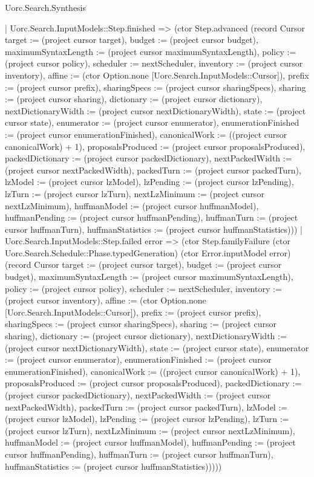 \begin{lexlean}{Uorc.Search.Synthesis}
\begin{semanticmodule}
{          | Uorc.Search.InputModels::Step.finished => (ctor Step.advanced (record Cursor {target := (project cursor target), budget := (project cursor budget), maximumSyntaxLength := (project cursor maximumSyntaxLength), policy := (project cursor policy), scheduler := nextScheduler, inventory := (project cursor inventory), affine := (ctor Option.none [Uorc.Search.InputModels::Cursor]), prefix := (project cursor prefix), sharingSpecs := (project cursor sharingSpecs), sharing := (project cursor sharing), dictionary := (project cursor dictionary), nextDictionaryWidth := (project cursor nextDictionaryWidth), state := (project cursor state), enumerator := (project cursor enumerator), enumerationFinished := (project cursor enumerationFinished), canonicalWork := ((project cursor canonicalWork) + 1), proposalsProduced := (project cursor proposalsProduced), packedDictionary := (project cursor packedDictionary), nextPackedWidth := (project cursor nextPackedWidth), packedTurn := (project cursor packedTurn), lzModel := (project cursor lzModel), lzPending := (project cursor lzPending), lzTurn := (project cursor lzTurn), nextLzMinimum := (project cursor nextLzMinimum), huffmanModel := (project cursor huffmanModel), huffmanPending := (project cursor huffmanPending), huffmanTurn := (project cursor huffmanTurn), huffmanStatistics := (project cursor huffmanStatistics)}))
          | Uorc.Search.InputModels::Step.failed error => (ctor Step.familyFailure (ctor Uorc.Search.Schedule::Phase.typedGeneration) (ctor Error.inputModel error) (record Cursor {target := (project cursor target), budget := (project cursor budget), maximumSyntaxLength := (project cursor maximumSyntaxLength), policy := (project cursor policy), scheduler := nextScheduler, inventory := (project cursor inventory), affine := (ctor Option.none [Uorc.Search.InputModels::Cursor]), prefix := (project cursor prefix), sharingSpecs := (project cursor sharingSpecs), sharing := (project cursor sharing), dictionary := (project cursor dictionary), nextDictionaryWidth := (project cursor nextDictionaryWidth), state := (project cursor state), enumerator := (project cursor enumerator), enumerationFinished := (project cursor enumerationFinished), canonicalWork := ((project cursor canonicalWork) + 1), proposalsProduced := (project cursor proposalsProduced), packedDictionary := (project cursor packedDictionary), nextPackedWidth := (project cursor nextPackedWidth), packedTurn := (project cursor packedTurn), lzModel := (project cursor lzModel), lzPending := (project cursor lzPending), lzTurn := (project cursor lzTurn), nextLzMinimum := (project cursor nextLzMinimum), huffmanModel := (project cursor huffmanModel), huffmanPending := (project cursor huffmanPending), huffmanTurn := (project cursor huffmanTurn), huffmanStatistics := (project cursor huffmanStatistics)}))))
}
\end{semanticmodule}
\end{lexlean}
